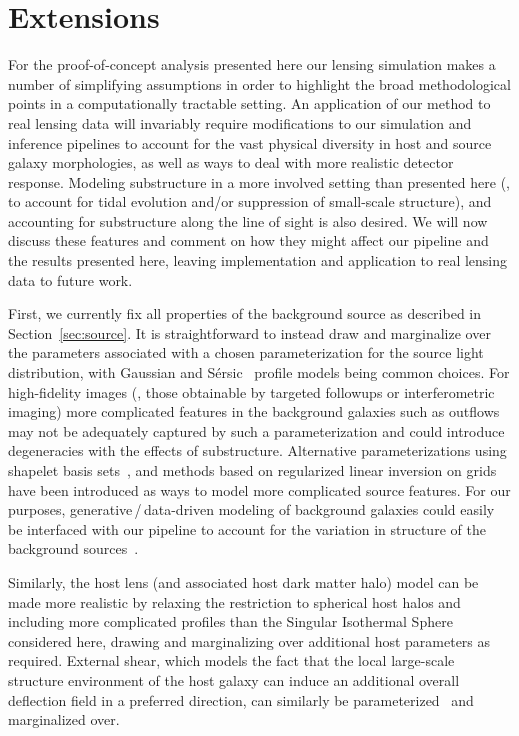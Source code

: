 \documentclass[twocolumn]{aastex63}
\begin{document}
\section{Extensions}
\label{sec:extensions}
%
For the proof-of-concept analysis presented here our lensing simulation makes a number of simplifying assumptions in order to highlight the broad methodological points in a computationally tractable setting. An application of our method to real lensing data will invariably require modifications to our simulation and inference pipelines to account for the vast physical diversity in host and source galaxy morphologies, as well as ways to deal with more realistic detector response. Modeling substructure in a more involved setting than presented here (\eg, to account for tidal evolution and/or suppression of small-scale structure), and accounting for substructure along the line of sight is also desired. We will now discuss these features and comment on how they might affect our pipeline and the results presented here, leaving implementation and application to real lensing data to future work.

First, we currently fix all properties of the background source as described in Section~\ref{sec:source}. It is straightforward to instead draw and marginalize over the parameters associated with a chosen parameterization for the source light distribution, with Gaussian and S\'{e}rsic~\citep{1963BAAA....6...41S} profile models being common choices. For high-fidelity images (\eg, those obtainable by targeted followups or interferometric imaging) more complicated features in the background galaxies such as outflows may not be adequately captured by such a parameterization and could introduce degeneracies with the effects of substructure. Alternative parameterizations using shapelet basis sets~\citep{1504.07629,1505.00198,1803.09746}, and methods based on regularized linear inversion on grids~\citep{2003ApJ...590..673W,astro-ph/0601493,1408.6297,1708.07377} have been introduced as ways to model more complicated source features. For our purposes, generative\,/\,data-driven modeling of background galaxies could easily be interfaced with our pipeline to account for the variation in structure of the background sources~\citep{1901.01359}.

Similarly, the host lens (and associated host dark matter halo) model can be made more realistic by relaxing the restriction to spherical host halos and including more complicated profiles than the Singular Isothermal Sphere considered here, drawing and marginalizing over additional host parameters as required. External shear, which models the fact that the local large-scale structure environment of the host galaxy can induce an additional overall deflection field in a preferred direction, can similarly be parameterized~\citep[\eg,][]{astro-ph/9610163,1997MNRAS.292..673S} and marginalized over.
\end{document}
